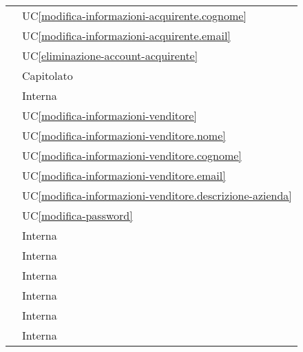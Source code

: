 \begin{longtable}{C{6cm} C{6cm}}
     & UC\ref{modifica-informazioni-acquirente.cognome} \\

     & UC\ref{modifica-informazioni-acquirente.email} \\

     & UC\ref{eliminazione-account-acquirente} \\

     & Capitolato \\

     & Interna \\

     & UC\ref{modifica-informazioni-venditore} \\
        
     & UC\ref{modifica-informazioni-venditore.nome} \\
        
     & UC\ref{modifica-informazioni-venditore.cognome} \\
        
     & UC\ref{modifica-informazioni-venditore.email} \\
        
     & UC\ref{modifica-informazioni-venditore.descrizione-azienda} \\

     & UC\ref{modifica-password} \\

     & Interna \\

     & Interna \\ 

     & Interna \\

     & Interna \\

     & Interna \\

     & Interna \\


\end{longtable}
